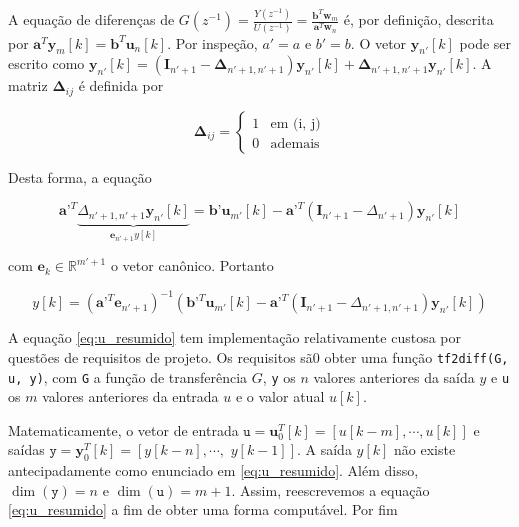 \documentclass[twoside, fleqn]{article}
\begin{document}
    A equação de diferenças de $G(z^{-1}) = \frac{Y(z^{-1})}{U(z^{-1})} = \frac{\textbf{b}^T \textbf{w}_{m}}{\textbf{a}^T \textbf{w}_{n}}$ é, por definição, descrita por $\textbf{a}^T \textbf{y}_{m}[k] = \textbf{b}^T \textbf{u}_{n}[k]$. Por inspeção, $a' = a$ e $b' = b$. O vetor $\textbf{y}_{n'}[k]$ pode ser escrito como $\textbf{y}_{n'}[k] = \left(\textbf{I}_{n' + 1} - \mathbf{\Delta}_{n'+1, n'+1}\right) \mathbf{y}_{n'}[k] + \mathbf{\Delta}_{n'+1, n'+1} \mathbf{y}_{n'}[k]$. A matriz $\mathbf{\Delta}_{ij}$ é definida por 
    
        \begin{equation}
          \mathbf{\Delta}_{ij} = 
          \begin{cases}
               1 & \mbox{em (i, j)}\\
               0 & \mbox{ademais}
          \end{cases}
        \end{equation}
    
    Desta forma, a equação 
    
        \begin{equation}
            \textbf{a'}^T \underbrace{\Delta_{n' + 1, n' + 1} \textbf{y}_{n'}[k]}_{\textbf{e}_{n'+1} y[k]} = \textbf{b'} \textbf{u}_{m'}[k] - \textbf{a'}^T (\textbf{I}_{n'+1} - \Delta_{n' + 1}) \textbf{y}_{n'}[k]
         \end{equation}
    
    com $\textbf{e}_{k} \in \mathbb{R}^{m'+1}$ o vetor canônico. Portanto
    
        \begin{equation}
            y[k] = \left(\textbf{a'}^T \textbf{e}_{n' + 1}\right)^{-1}\left(\textbf{b'}^T \textbf{u}_{m'}[k] - \textbf{a'}^T (\textbf{I}_{n' + 1} - \Delta_{n' + 1, n' + 1}) \textbf{y}_{n'}[k]\right)
            \label{eq:u_resumido}
        \end{equation}
    
    A equação \eqref{eq:u_resumido} tem implementação relativamente custosa por questões de requisitos de projeto. Os requisitos sã0 obter uma função \texttt{tf2diff(G, u, y)}, com \texttt{G} a função de transferência $G$, \texttt{y} os $n$ valores anteriores da saída $y$ e \texttt{u} os $m$ valores anteriores da entrada $u$ e o valor atual $u[k]$.
    
    Matematicamente, o vetor de entrada $\texttt{u} = \mathbf{u}_0^T[k] = \left[u[k - m], \cdots, u[k]\right]$ e saídas $\texttt{y} = \mathbf{y}_0^T[k] = \left[y[k - n], \cdots,\right.$ $\left.y[k - 1]\right]$. A saída $y[k]$ não existe antecipadamente como enunciado em \eqref{eq:u_resumido}. Além disso, $\dim(\texttt{y}) = n$ e $\dim(\texttt{u}) = m + 1$. Assim, reescrevemos a equação \eqref{eq:u_resumido} a fim de obter uma forma computável. Por fim
    
\end{document}

